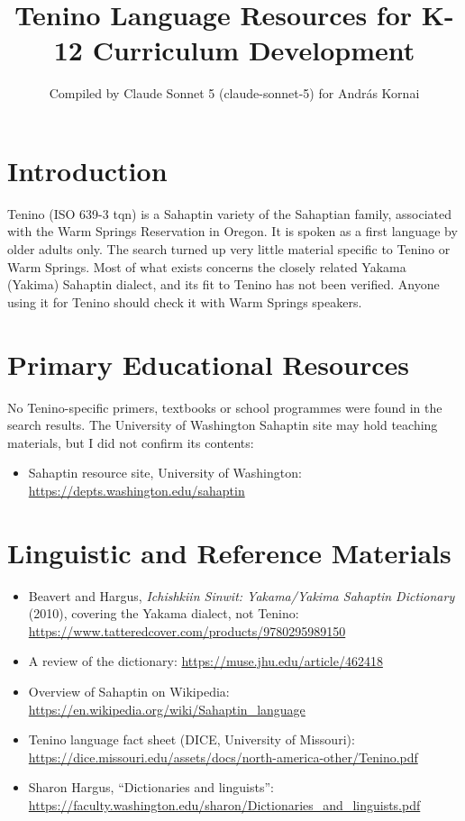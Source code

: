 \documentclass[12pt]{article}
\title{Tenino Language Resources for K-12 Curriculum Development}
\author{Compiled by Claude Sonnet 5 (claude-sonnet-5) for Andr\'as Kornai}
\date{}
\begin{document}
\maketitle

\section{Introduction}
Tenino (ISO 639-3 tqn) is a Sahaptin variety of the Sahaptian family, associated with the Warm Springs Reservation in Oregon. It is spoken as a first language by older adults only. The search turned up very little material specific to Tenino or Warm Springs. Most of what exists concerns the closely related Yakama (Yakima) Sahaptin dialect, and its fit to Tenino has not been verified. Anyone using it for Tenino should check it with Warm Springs speakers.

\section{Primary Educational Resources}
No Tenino-specific primers, textbooks or school programmes were found in the search results. The University of Washington Sahaptin site may hold teaching materials, but I did not confirm its contents:
\begin{itemize}
\item Sahaptin resource site, University of Washington: \url{https://depts.washington.edu/sahaptin}
\end{itemize}

\section{Linguistic and Reference Materials}
\begin{itemize}
\item Beavert and Hargus, \emph{Ichishkiin Sinwit: Yakama/Yakima Sahaptin Dictionary} (2010), covering the Yakama dialect, not Tenino: \url{https://www.tatteredcover.com/products/9780295989150}
\item A review of the dictionary: \url{https://muse.jhu.edu/article/462418}
\item Overview of Sahaptin on Wikipedia: \url{https://en.wikipedia.org/wiki/Sahaptin_language}
\item Tenino language fact sheet (DICE, University of Missouri): \url{https://dice.missouri.edu/assets/docs/north-america-other/Tenino.pdf}
\item Sharon Hargus, ``Dictionaries and linguists'': \url{https://faculty.washington.edu/sharon/Dictionaries_and_linguists.pdf}
\end{itemize}
\end{document}
